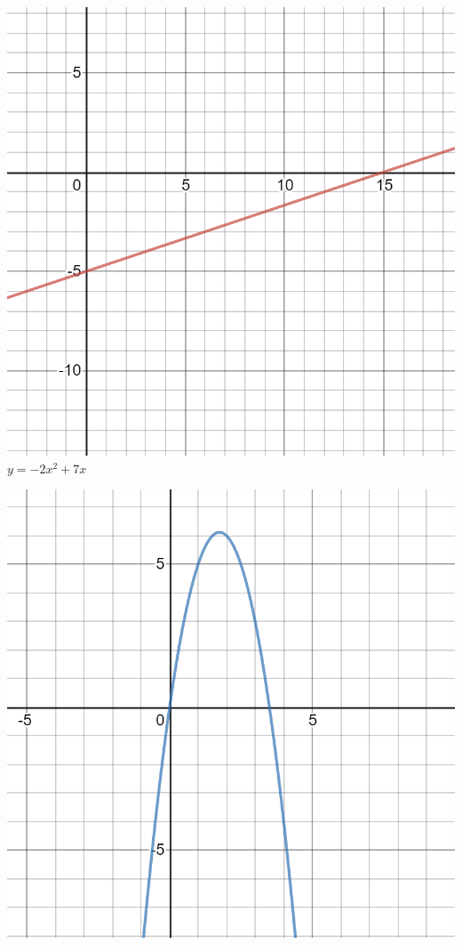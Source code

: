 \documentclass[12pt]{article}
\begin{document}
\includegraphics[scale=0.25]{desmos-graph.png}\\

$y=-2x^{2}+7x$

\includegraphics[scale=0.25]{desmos-graph (1).png}\\
\end{document}
